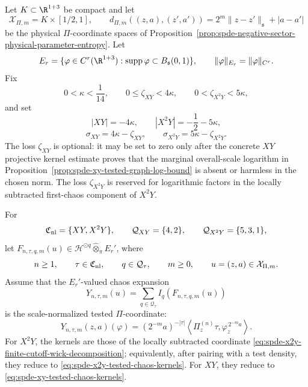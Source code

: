 \begin{proposition}
\label{prop:spde-nonlinear-pi-coordinate-input-from-kernels}
Let \(K\subset\R^{1+3}\) be compact and let
\[
  \mathcal X_{\Pi,m}=K\times[1/2,1],
  \qquad
  d_{\Pi,m}((z,a),(z',a'))=2^m\|z-z'\|_{\mathfrak s}+|a-a'|
\]
be the physical \(\Pi\)-coordinate spaces of
Proposition~\ref{prop:spde-negative-sector-physical-parameter-entropy}.  Let
\[
  E_r=
  \{\varphi\in C^r(\R^{1+3}):
    \operatorname{supp}\varphi\subset B_{\mathfrak s}(0,1)\},
  \qquad
  \|\varphi\|_{E_r}=\|\varphi\|_{C^r}.
\]
Fix
\[
  0<\kappa<\frac1{14},
  \qquad
  0\leq\zeta_{XY}<4\kappa,
  \qquad
  0<\zeta_{X^2Y}<5\kappa,
\]
and set
\[
  |\!XY\!|=-4\kappa,\qquad
  |X^2Y|=-\frac12-5\kappa,
\]
\begin{equation}
  \sigma_{XY}=4\kappa-\zeta_{XY},
  \qquad
  \sigma_{X^2Y}=5\kappa-\zeta_{X^2Y} .
  \label{eq:spde-nonlinear-pi-coordinate-slacks}
\end{equation}
The loss \(\zeta_{XY}\) is optional: it may be set to zero only after the
concrete \(XY\) projective kernel estimate proves that the marginal
overall-scale logarithm in
Proposition~\ref{prop:spde-xy-tested-graph-log-bound} is absent
or harmless in the chosen norm.  The loss \(\zeta_{X^2Y}\) is reserved for
logarithmic factors in the locally subtracted first-chaos component of
\(X^2Y\).

For
\[
  \mathfrak C_{\rm nl}=\{XY,X^2Y\},
  \qquad
  \mathcal Q_{XY}=\{4,2\},
  \qquad
  \mathcal Q_{X^2Y}=\{5,3,1\},
\]
let \(F_{n,\tau,q,m}(u)\in\mathcal H^{\odot q}\widehat\otimes_\pi E_r'\),
where
\[
  n\geq1,\qquad
  \tau\in\mathfrak C_{\rm nl},\qquad
  q\in\mathcal Q_\tau,\qquad
  m\geq0,\qquad
  u=(z,a)\in\mathcal X_{\Pi,m}.
\]
Assume that the \(E_r'\)-valued chaos expansion
\begin{equation}
  Y_{n,\tau,m}(u)
  =
  \sum_{q\in\mathcal Q_\tau}I_q(F_{n,\tau,q,m}(u))
  \label{eq:spde-nonlinear-pi-coordinate-er-chaos}
\end{equation}
is the scale-normalized tested \(\Pi\)-coordinate:
\begin{equation}
  Y_{n,\tau,m}(z,a)(\varphi)
  =
  (2^{-m}a)^{-|\tau|}
  \left\langle
    \Pi_z^{(n)}\tau,\varphi_z^{\,2^{-m}a}
  \right\rangle .
  \label{eq:spde-nonlinear-pi-coordinate-er-identification}
\end{equation}
For \(X^2Y\), the kernels are those of the locally subtracted coordinate
\eqref{eq:spde-x2y-finite-cutoff-wick-decomposition}; equivalently, after
pairing with a test density, they reduce to
\eqref{eq:spde-x2y-tested-chaos-kernels}.  For \(XY\), they reduce to
\eqref{eq:spde-xy-tested-chaos-kernels}.


\end{proposition}
